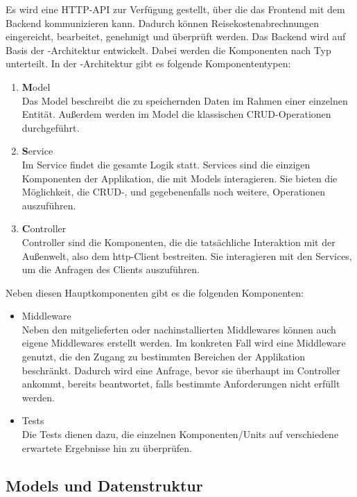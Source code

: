 Es wird eine HTTP-API zur Verfügung gestellt, über die das Frontend mit dem Backend kommunizieren kann. Dadurch können Reisekostenabrechnungen eingereicht, bearbeitet, genehmigt und überprüft werden. Das Backend wird auf Basis der -Architektur entwickelt. Dabei werden die Komponenten nach Typ unterteilt. In der -Architektur gibt es folgende Komponententypen:

\begin{enumerate}
  \item \textbf{M}odel\\
  Das Model beschreibt die zu speichernden Daten im Rahmen einer einzelnen Entität. Außerdem werden im Model die klassischen CRUD-Operationen durchgeführt.
  \item \textbf{S}ervice\\
  Im Service findet die gesamte Logik statt. Services sind die einzigen Komponenten der Applikation, die mit Models interagieren. Sie bieten die Möglichkeit, die CRUD-, und gegebenenfalls noch weitere, Operationen auszuführen. 
  \item \textbf{C}ontroller\\
  Controller sind die Komponenten, die die tatsächliche Interaktion mit der Außenwelt, also dem http-Client bestreiten. Sie interagieren mit den Services, um die Anfragen des Clients auszuführen.
\end{enumerate}

Neben diesen Hauptkomponenten gibt es die folgenden Komponenten:

\begin{itemize}
  \item Middleware\\
  Neben den mitgelieferten oder nachinstallierten Middlewares können auch eigene Middlewares erstellt werden. Im konkreten Fall wird eine Middleware genutzt, die den Zugang zu bestimmten Bereichen der Applikation beschränkt. Dadurch wird eine Anfrage, bevor sie überhaupt im Controller ankommt, bereits beantwortet, falls bestimmte Anforderungen nicht erfüllt werden.
  \item Tests\\
  Die Tests dienen dazu, die einzelnen Komponenten/Units auf verschiedene erwartete Ergebnisse hin zu überprüfen.
\end{itemize}

\subsection{Models und Datenstruktur}

